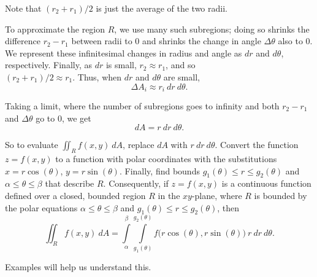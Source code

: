 Note that $(r_2+r_1)/2$ is just the average of the two radii. 

To approximate the region $R$, we use many such subregions; doing so shrinks the difference $r_2-r_1$ between radii to 0 and shrinks the change in angle $\Delta \theta$ also to 0. We represent these infinitesimal changes in radius and angle as $dr$ and $d\theta$, respectively. Finally, as $dr$ is small, $r_2\approx r_1$, and so \\ $(r_2+r_1)/2\approx r_1$. Thus, when $dr$ and $d\theta$ are small, 
$$\Delta A_i \approx r_i\ dr\ d\theta.$$

Taking a limit, where the number of subregions goes to infinity and both $r_2-r_1$ and $\Delta\theta$ go to 0, we get $$dA = r\ dr\ d\theta.$$

So to evaluate $\iint_Rf(x,y)\ dA$, replace $dA$ with $r\ dr\ d\theta$. Convert the function $z=f(x,y)$ to a function with polar coordinates with the substitutions $x=r\cos(\theta)$, $y=r\sin(\theta)$. Finally, find bounds $g_1(\theta)\leq r\leq g_2(\theta)$ and $\alpha\leq\theta\leq\beta$ that describe $R$. Consequently, if $z=f(x,y)$ is a continuous function defined over a closed, bounded region $R$ in the $xy$-plane, where $R$ is
bounded by the polar equations $\alpha\leq\theta\leq\beta$ and  $g_1(\theta)\leq r\leq g_2(\theta)$, then 
\begin{equation}
\iint_Rf(x,y)\ dA = \int\limits_\alpha^\beta\int\limits_{g_1(\theta)}^{g_2(\theta)} f\big(r\cos(\theta),r\sin(\theta)\big)\ r\ dr\ d\theta.
\label{idea:doublepol}
\end{equation}

Examples will help us understand this.

